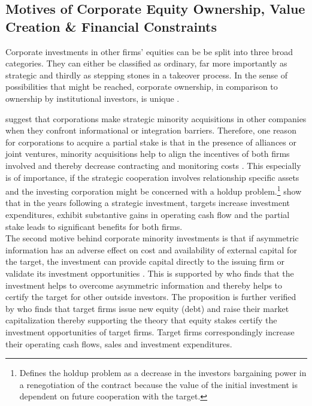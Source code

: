 \documentclass[12pt]{article}
\begin{document}
\subsection{Motives of Corporate Equity Ownership, Value Creation \& Financial Constraints}

Corporate investments in other firms' equities can be be split into three broad categories. They can either be classified as ordinary, far more importantly as strategic and thirdly as stepping stones in a takeover process. 
In the sense of possibilities that might be reached, corporate ownership, in comparison to ownership by institutional investors, is unique \citep[p.2791]{Allen2000}.

\citet[p.1]{Huang2017} suggest that corporations make strategic minority acquisitions in other companies when they confront informational or integration barriers. 
Therefore, one reason for corporations to acquire a partial stake is that in the presence of alliances or joint ventures, minority acquisitions help to align the incentives of both firms involved and thereby decrease contracting and monitoring costs \citep[p.2792]{Allen2000}. This especially is of importance, if the strategic cooperation involves relationship specific assets and the investing corporation might be concerned with a holdup problem.\footnote{\citet[p.1023]{Ouimet2013} Defines the holdup problem as a decrease in the investors bargaining power in a renegotiation of the contract because the value of the initial investment is dependent on future cooperation with the target.} \citet[p. 2793]{Allen2000} show that in the years following a strategic investment,  targets increase investment expenditures, exhibit substantive gains in operating cash flow and the partial stake leads to significant benefits for both firms.\\
The second motive behind corporate minority investments is that if asymmetric information has an adverse effect on cost and availability of external capital for the target, the investment can provide capital directly to the issuing firm or validate its investment opportunities \citep[p.2792]{Allen2000}. This is supported by \citet[p.1038]{Ouimet2013} who finds that the investment helps to overcome asymmetric information and thereby helps to certify the target for other outside investors. The proposition is further verified by \citet[p.78]{Liao2014} who finds that target firms issue new equity (debt) and raise their market capitalization thereby supporting the theory that equity stakes certify the investment opportunities of target firms. Target firms correspondingly increase their operating cash flows, sales and investment expenditures.\\ 
\end{document}
